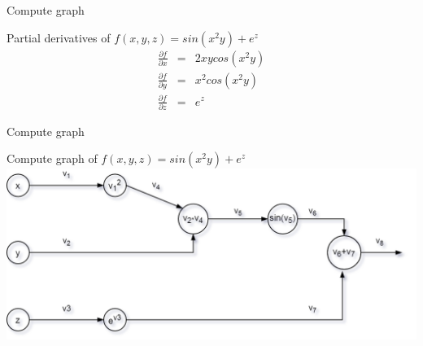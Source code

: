 
\begin{frame}{Compute graph}
	\begin{block}{ Partial derivatives of $f(x,y,z)= sin(x^2y)+e^z$}
		\begin{align}
			\frac{\partial f}{\partial x} &=& 2xycos(x^2y) \\
			\frac{\partial f}{\partial y} &=& x^2cos(x^2y) \\
			\frac{\partial f}{\partial z} &=& e^z 
		\end{align}
	\end{block}
\end{frame} 

\begin{frame}{Compute graph}
	\begin{block}{ Compute graph of $f(x,y,z)= sin(x^2y)+e^z$}
		\includegraphics[width=1.\textwidth, center]{figuras/backprop_eg1.png}
	\end{block}
\end{frame}

